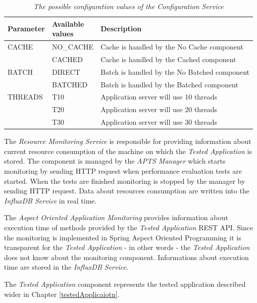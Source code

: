 \documentclass[12pt,a4paper]{article}
\begin{document}
\begin{table}[!htb]
\caption{\textit{The possible configuration values of the \textit{Configuration Service}}}\label{table:configurationvalues}
\begin{tabularx}{\textwidth}{p{1.6cm}|p{1.8cm}|X}
\textbf{Parameter} &\textbf{Available \newline values} & \textbf{Description} \\\hline
CACHE & NO\_CACHE & Cache is handled by the No Cache component\\\cline{2-3}
      & CACHED    & Cache is handled by the Cached component   \\ \hline
BATCH & DIRECT    & Batch is handled by the No Batched component   \\\cline{2-3}
	  & BATCHED   & Batch is handled by the Batched component   \\ \hline
THREADS & T10     & Application server will use 10 threads\\ \cline{2-3}
        & T20     & Application server will use 20 threads\\ \cline{2-3}
        & T30     & Application server will use 30 threads\\ \hline
\end{tabularx}
\end{table}	


The \textit{Resource Monitoring Service} is responsible for providing information about current resource consumption of the machine on which the \textit{Tested Application} is stored. The component is managed by the \textit{APTS Manager} which starts monitoring by sending HTTP request when performance evaluation tests are started. When the tests are finished monitoring is stopped by the manager by sending HTTP request. Data about resources consumption are written into the \textit{InfluxDB Service} in real time. 

The \textit{Aspect Oriented Application Monitoring} provides information about execution time of methods provided by the \textit{Tested Application} REST API. Since the monitoring is implemented in Spring Aspect Oriented Programming \cite{springaop} it is transparent for the \textit{Tested Application} - in other words - the \textit{Tested Application} does not know about the monitoring component. Informations about execution time are stored in the \textit{InfluxDB Service}.

The \textit{Tested Application} component represents the tested application described      wider in Chapter \ref{testedApplicaiotn}.
\end{document}
